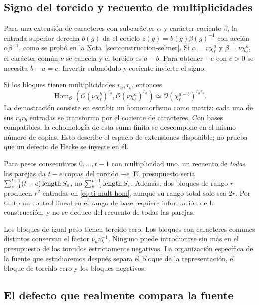 \subsection{Signo del torcido y recuento de multiplicidades}

Para una extensión de caracteres con subcarácter $\alpha$ y
carácter cociente $\beta$, la entrada superior derecha $b(g)$
da el cociclo $z(g)=b(g)\beta(g)^{-1}$ con acción $\alpha\beta^{-1}$,
como se probó en la Nota~\ref{sec:construccion-selmer}.
Si $\alpha=\nu\chi_\ell^a$ y $\beta=\nu\chi_\ell^b$, el
carácter común $\nu$ se cancela y el torcido es $a-b$.
Para obtener $-e$ con $e>0$ se necesita $b-a=e$.
Invertir submódulo y cociente invierte el signo.

Si los bloques tienen multiplicidades $r_a,r_b$, entonces
\begin{equation}
 \operatorname{Hom}_{\mathcal O}
   (\mathcal O(\nu\chi_\ell^b)^{r_b},
    \mathcal O(\nu\chi_\ell^a)^{r_a})
 \simeq\mathcal O(\chi_\ell^{a-b})^{r_a r_b}.
 \label{eq:ti-mult-hom}
\end{equation}
La demostración consiste en escribir un homomorfismo como matriz:
cada una de sus $r_a r_b$ entradas se transforma por el cociente
de caracteres. Con bases compatibles, la cohomología de esta suma
finita se descompone en el mismo número de copias. Esto describe
el espacio de extensiones disponible; no prueba que un defecto
de Hecke se inyecte en él.

Para pesos consecutivos $0,\ldots,t-1$ con multiplicidad uno,
un recuento de \emph{todas} las parejas da $t-e$ copias del
torcido $-e$. El presupuesto sería
$\sum_{e=1}^{t-1}(t-e)\operatorname{length} S_e$, no
$\sum_{e=1}^{t-1}\operatorname{length} S_e$.
Además, dos bloques de rango $r$ producen $r^2$ entradas en
\eqref{eq:ti-mult-hom}, aunque su rango total solo sea $2r$.
Por tanto un control lineal en el rango de base requiere
información de la construcción, y no se deduce del recuento
de todas las parejas.

Los bloques de igual peso tienen torcido cero. Los bloques con
caracteres comunes distintos conservan el factor
$\nu_a\nu_b^{-1}$. Ninguno puede introducirse sin más en el
presupuesto de los torcidos estrictamente negativos.
La organización específica de la fuente que estudiaremos después
separa el bloque de la representación, el bloque de torcido cero
y los bloques negativos.

\subsection{El defecto que realmente compara la fuente}

